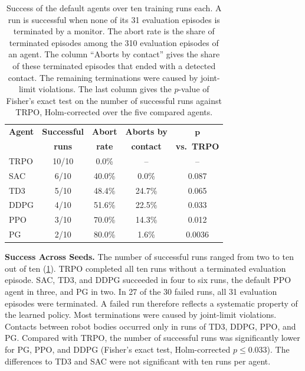 \documentclass{ieeeaccess}
\begin{document}
\begin{table}[!t]
\centering
\caption{Success of the default agents over ten training runs each. A run is successful when none of its
31 evaluation episodes is terminated by a monitor. The abort rate is the share of terminated episodes among
the 310 evaluation episodes of an agent. The column ``Aborts by contact'' gives the share of these
terminated episodes that ended with a detected contact. The remaining terminations were caused by
joint-limit violations. The last column gives the $p$-value of Fisher's exact test on the number of
successful runs against TRPO, Holm-corrected over the five compared agents.}
\label{tab:robustness_seeds}
\renewcommand{\arraystretch}{1.2}
\begin{tabular}{lcccc}
\toprule
\textbf{Agent} & \textbf{Successful} & \textbf{Abort} & \textbf{Aborts by} & $\boldsymbol{p}$ \\
 & \textbf{runs} & \textbf{rate} & \textbf{contact} & \textbf{vs.\ TRPO} \\
\midrule
TRPO & 10/10 & 0.0\% & -- & -- \\
SAC & 6/10 & 40.0\% & 0.0\% & 0.087 \\
TD3 & 5/10 & 48.4\% & 24.7\% & 0.065 \\
DDPG & 4/10 & 51.6\% & 22.5\% & 0.033 \\
PPO & 3/10 & 70.0\% & 14.3\% & 0.012 \\
PG & 2/10 & 80.0\% & 1.6\% & 0.0036 \\
\bottomrule
\end{tabular}
\end{table}

\textbf{Success Across Seeds.} The number of successful runs ranged from two to ten out of ten
(\cref{tab:robustness_seeds}). TRPO completed all ten runs without a terminated evaluation episode.
SAC, TD3, and DDPG succeeded in four to six runs, the default PPO agent in three, and PG in two. In
27 of the 30 failed runs, all 31 evaluation episodes were terminated. A failed run therefore reflects a
systematic property of the learned policy. Most terminations were caused by joint-limit violations.
Contacts between robot bodies occurred only in runs of TD3, DDPG, PPO, and PG. Compared with TRPO, the
number of successful runs was significantly lower for PG, PPO, and DDPG (Fisher's exact test,
Holm-corrected $p \le 0.033$). The differences to TD3 and SAC were not significant with ten runs per
agent.
\end{document}
